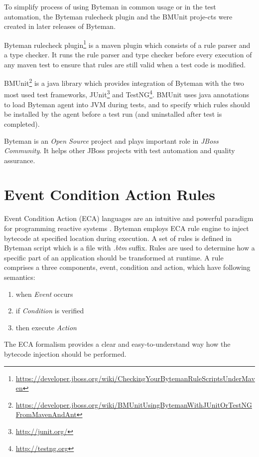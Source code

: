 \documentclass[12pt,oneside]{fithesis2}
\begin{document}
To simplify process of using Byteman in common usage or in the test automation, the Byteman rulecheck plugin and the BMUnit proje-cts were created in later releases of Byteman.

Byteman rulecheck plugin\footnote{\url{https://developer.jboss.org/wiki/CheckingYourBytemanRuleScriptsUnderMaven}} is a maven plugin which consists of a rule parser and a type checker. It runs the rule parser and type checker before every execution of any maven test to ensure that rules are still valid when a test code is modified.

BMUnit\footnote{\url{https://developer.jboss.org/wiki/BMUnitUsingBytemanWithJUnitOrTestNGFromMavenAndAnt}} is a java library which provides integration of Byteman with the two most used test frameworks, JUnit\footnote{\url{http://junit.org/}} and TestNG\footnote{\url{http://testng.org}}. BMUnit uses java annotations to load Byteman agent into JVM during tests, and to specify which rules should be installed by the agent before a test run (and uninstalled after test is completed).

Byteman is an \textit{Open Source} project and plays important role in \textit{JBoss Community}. It helps other JBoss projects with test automation and quality assurance.

\section{Event Condition Action Rules}
\label{sec:eca_sec}
Event Condition Action (ECA) languages are an intuitive and powerful paradigm for programming reactive systems \cite{eca}. Byteman employs ECA rule engine to inject bytecode at specified location during execution. A set of rules is defined in Byteman script which is a file with \textit{.btm} suffix. Rules are used to determine how a specific part of an application should be transformed at runtime. A rule comprises a three components, event, condition and action, which have following semantics\cite{eca}:

\begin{enumerate}
   \item when \textit{Event} occurs
   \item if \textit{Condition} is verified
   \item then execute \textit{Action}
\end{enumerate}

The ECA formalism provides a clear and easy-to-understand way how the bytecode injection should be performed.
\end{document}

